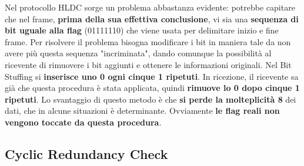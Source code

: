\documentclass[12pt]{article}
\begin{document}
Nel protocollo HLDC sorge un problema abbastanza evidente: potrebbe capitare che nel frame, \textbf{prima della sua effettiva conclusione}, vi sia una \textbf{sequenza di bit uguale alla flag} (01111110) che viene usata per delimitare inizio e fine frame. Per risolvere il problema bisogna modificare i bit in maniera tale da non avere più questa sequenza "incriminata", dando comunque la possibilità al ricevente di rimuovere i bit aggiunti e ottenere le informazioni originali. Nel Bit Stuffing si \textbf{inserisce uno 0 ogni cinque 1 ripetuti}. In ricezione, il ricevente sa già che questa procedura è stata applicata, quindi \textbf{rimuove lo 0 dopo cinque 1 ripetuti}. Lo svantaggio di questo metodo è che \textbf{si perde la molteplicità 8} dei dati, che in alcune situazioni è determinante. Ovviamente \textbf{le flag reali non vengono toccate da questa procedura}.

\subsection{Cyclic Redundancy Check}
\end{document}
